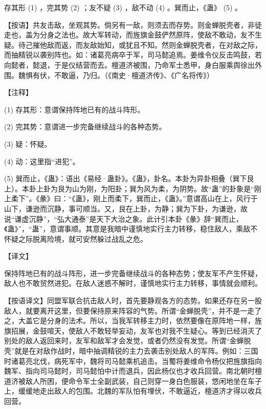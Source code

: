 \documentclass[12pt,UTF8]{ctexbook}
\begin{document}
存其形 (1) ，完其势 (2) ；友不疑 (3) ，敌不动 (4) 。巽而止，《蛊》 (5) 。

【按语】共友击敌，坐观其势。倘另有一敌，则须去而存势。则金蝉脱壳者，非徒走也，盖为分身之法也。故大军转动，而旌旗金鼓俨然原阵，使敌不敢动，友不生疑。待己摧他敌而返，而友敌始知，或犹且不知。然则金蝉脱壳者，在对敌之际，而抽精锐以袭别阵也。如：诸葛亮病卒于军，司马懿追焉。姜维令仪反击鸣鼓，若向懿者，懿退，于是仪结营而去。檀道济被围，乃命军士悉甲，身白服乘舆徐出外围。魏惧有伏，不敢逼，乃归。（《南史·檀道济传》、《广名将传》）





【注释】


(1) 存其形：意谓保持阵地已有的战斗阵形。

(2) 完其势：意谓进一步完备继续战斗的各种态势。

(3) 疑：怀疑。

(4) 动：这里指“进犯”。

(5) 巽而止，《蛊》：语出《易经·蛊卦》。《蛊》，卦名。本卦为异卦相叠（巽下艮上）。本卦上卦为艮为山为刚，为阳卦；巽为风为柔，为阴势。故“蛊”的卦象是“刚上柔下”。《彖》曰：“《蛊》，刚上而柔下，巽而止，《蛊》。”意谓高山在上，风行于山下，谦逊而沉静，事可顺当。又，艮在上卦，为静；巽为下卦，为谦逊，故说“谦虚沉静”，“弘大通泰”是天下大治之象。此计引本卦《彖》辞“巽而止，《蛊》”，“蛊”，意谓事顺。其意是我暗中谨慎地实行主力转移，稳住敌人，乘敌不怀疑之际脱离险境，就可安然躲过战乱之危。





【译文】


保持阵地已有的战斗阵形，进一步完备继续战斗的各种态势；使友军不产生怀疑，敌人也不敢贸然进犯。在敌人迷惑不解时，谨慎地实行主力转移，事情就会顺利。

【按语译文】同盟军联合抗击敌人时，首先要静观各方的态势。如果还存在另一股敌人，就要离开这里，但要保持原来阵容的气势。所谓“金蝉脱壳”，并不是一走了之，大盖它是分身的法术。所以，当我军转移主力时，依然要像在原阵地一样，旌旗招展，金鼓喧天，使敌人不敢轻举妄动，友军也对我不生疑心。等到已经消灭了别处的敌人返回来时，友军和敌军才会发觉，或者仍然没有发觉。所谓“金蝉脱壳”就是在对敌作战时，暗中抽调精锐的主力去袭击别处敌人的军阵。例如：三国时诸葛亮北伐，病死军中，魏将司马懿乘机追击。当蜀将姜维命令杨仪把旌旗指向魏军、指向司马懿时，司马懿怕中计而退兵，因此杨仪也才收兵回营。南北朝时檀道济被敌人所困，便命令军士全副武装，自己则穿一身白色服装，悠闲地坐在车子上，缓缓地走出敌人的包围。北魏的军队怕有埋伏，不敢逼近，檀道济才得以收兵回营。
\end{document}
